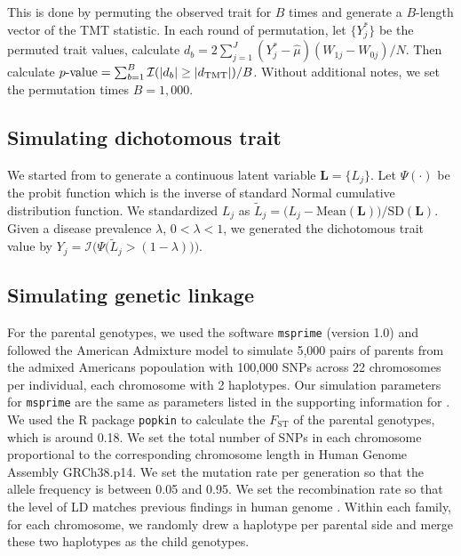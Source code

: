 \documentclass[12pt]{extarticle}
\newcommand{\indicator}{\mathcal{I}}
\newcommand{\tmt}{{\normalfont \text{TMT}}}
\begin{document}
{{This is done by permuting the observed trait for $B$ times and generate a $B$-length vector of the TMT statistic. In each round of permutation, let $\{Y^{\ast}_j\}$ be the permuted trait values, calculate $d_b=2\sum_{j=1}^J (Y_j^{\ast}-\hat{\mu})(W_{1j}-W_{0j})/N$. Then calculate $p\text{-value}=\sum_{b=1}^B\indicator(|d_b|\geq |d_{\tmt}|)/B$. Without additional notes, we set the permutation times $B=1,000$.

\subsection{Simulating dichotomous trait} \label{app:sim_binary_trait}

We started from  to generate a continuous latent variable $\boldsymbol{L}=\{L_j\}$. Let $\Psi(\cdot)$ be the probit function which is the inverse of standard Normal cumulative distribution function. We standardized $L_j$ as $
\tilde{L}_j=\big(L_j-\text{Mean}(\boldsymbol{L})\big)/\text{SD}(\boldsymbol{L})$. Given a disease prevalence $\lambda$, $0<\lambda <1$, we generated the dichotomous trait value by $Y_j = \indicator \Big(\Psi\big(\tilde{L}_j>(1-\lambda)\big)\Big)$.

\subsection{Simulating genetic linkage} \label{app:simulate_genetic_linkage}

For the parental genotypes, we used the software \texttt{msprime} (version 1.0) \citep{baumdicker2022} and followed the American Admixture model \citep{browning2018} to simulate 5,000 pairs of parents from the admixed Americans popoulation with 100,000 SNPs across 22 chromosomes per individual, each chromosome with 2 haplotypes. Our simulation parameters for \texttt{msprime} are the same as parameters listed in the supporting information for \citep{browning2018}. We used the R package \texttt{popkin} \citep{ochoa2021} to calculate the $F_{\text{ST}}$ of the parental genotypes, which is around 0.18. We set the total number of SNPs in each chromosome proportional to the corresponding chromosome length in Human Genome Assembly GRCh38.p14. We set the mutation rate per generation so that the allele frequency is between 0.05 and 0.95. We set the recombination rate so that the level of LD matches previous findings in human genome \citep{reich2001, dawson2002}. Within each family, for each chromosome, we randomly drew a haplotype per parental side and merge these two haplotypes as the child genotypes. 

}}
\end{document}
